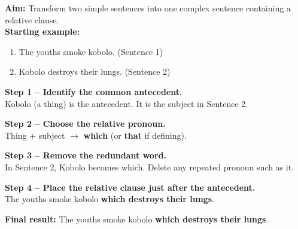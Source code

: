 \documentclass[11pt]{article}
\begin{document}
\begin{methode}
\textbf{Aim:} Transform two simple sentences into one complex sentence containing a relative clause.
\\[6pt]
\textbf{Starting example:}
\begin{enumerate}
\item The youths smoke kobolo. (Sentence 1)
\item Kobolo destroys their lungs. (Sentence 2)
\end{enumerate}

\textbf{Step 1 -- Identify the common antecedent.} \\
\og Kobolo\fg{} (a thing) is the antecedent. It is the subject in Sentence 2.

\textbf{Step 2 -- Choose the relative pronoun.} \\
Thing + subject $\rightarrow$ \textbf{which} (or \textbf{that} if defining).

\textbf{Step 3 -- Remove the redundant word.} \\
In Sentence 2, \og Kobolo\fg{} becomes \og which\fg. Delete any repeated pronoun such as \og it\fg.

\textbf{Step 4 -- Place the relative clause just after the antecedent.} \\
\og The youths smoke kobolo \textbf{which destroys their lungs}.\fg

\textbf{Final result:} \og The youths smoke kobolo \textbf{which destroys their lungs}.\fg
\end{methode}
\end{document}
